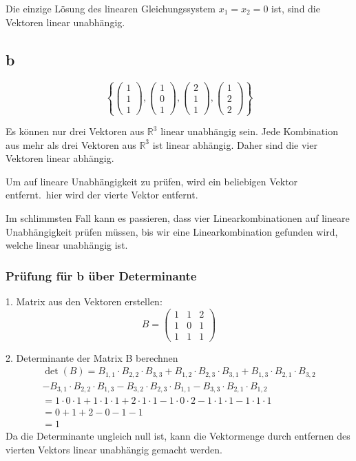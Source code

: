 Die einzige Lösung des linearen Gleichungssystem $x_1 = x_2 = 0$ ist, sind die Vektoren linear unabhängig.

\subsection{b}
\[ \left\{ \begin{pmatrix} 1 \\ 1 \\ 1 \end{pmatrix},
\begin{pmatrix} 1 \\ 0 \\ 1 \end{pmatrix}, \begin{pmatrix} 2 \\ 1 \\ 1 \end{pmatrix},
\begin{pmatrix} 1 \\ 2 \\ 2 \end{pmatrix} \right\} \]

Es können nur drei Vektoren aus $\mathbb{R}^3$ linear unabhängig sein. Jede Kombination aus mehr als drei Vektoren aus $\mathbb{R}^3$ ist linear abhängig. Daher sind die vier Vektoren linear abhängig.

Um auf lineare Unabhängigkeit zu prüfen, wird ein beliebigen Vektor entfernt.\ hier wird der vierte Vektor entfernt.

Im schlimmsten Fall kann es passieren, dass vier Linearkombinationen auf lineare Unabhängigkeit prüfen müssen, bis wir eine Linearkombination gefunden wird, welche linear unabhängig ist.

\subsubsection{Prüfung für b über Determinante}
1.  Matrix aus den Vektoren erstellen:
    \[ B = \begin{pmatrix} 1 & 1 & 2 \\ 1 & 0 & 1 \\ 1 & 1 & 1 \end{pmatrix} \]

2. Determinante der Matrix B berechnen
    \begin{align*}
        \det(B) = B_{1,1} \cdot B_{2,2} \cdot B_{3,3} + B_{1,2} \cdot B_{2,3} \cdot B_{3,1} + B_{1,3} \cdot B_{2,1} \cdot B_{3,2} \\ - B_{3,1} \cdot B_{2,2} \cdot B_{1,3} - B_{3,2} \cdot B_{2,3} \cdot B_{1,1} - B_{3,3} \cdot B_{2,1} \cdot B_{1,2}\\
        = 1 \cdot 0 \cdot 1 + 1 \cdot 1 \cdot 1 + 2 \cdot 1 \cdot 1 - 1 \cdot 0 \cdot 2 - 1 \cdot 1 \cdot 1 - 1 \cdot 1 \cdot 1 \\
        = 0 + 1 + 2 - 0 - 1 - 1 \\
        = 1
    \end{align*}
    Da die Determinante ungleich null ist, kann die Vektormenge durch entfernen des vierten Vektors linear unabhängig gemacht werden.


